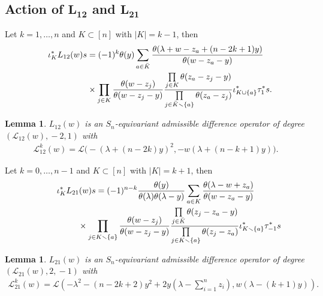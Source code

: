 \documentclass[pdftex]{sigma}
\numberwithin{equation}{section}
\newtheorem{Lemma}[Theorem]{Lemma}
\begin{document}
\subsection[Action of $L_{12}$ and $L_{21}$]{Action of $\boldsymbol{L_{12}}$ and $\boldsymbol{L_{21}}$}\label{ss-6.2}
Let $k=1,\dots,n$ and $K\subset[n]$ with $|K|=k-1$, then
\begin{gather*} \iota^*_K L_{12}(w)s =(-1)^k\theta(y)\sum_{a\in \bar K} \frac {\theta(\lambda+w-z_a+(n-2k+1)y)} {\theta(w-z_a-y)} \\
\hphantom{\iota^*_K L_{12}(w)s =}{} \times \prod_{j\in K} \frac {\theta(w-z_j)} {\theta(w-z_j-y)} \frac {\prod\limits_{j\in K} \theta(z_a-z_j-y) } { \prod\limits_{j\in \bar K\smallsetminus\{a\}} \theta(z_a-z_j) } \iota_{K\cup\{a\}}^*\tau_1^*s.
\end{gather*}
\begin{Lemma}\label{l-L12} $L_{12}(w)$ is an $S_n$-equivariant admissible difference operator of degree $(\mathcal L_{12}(w),\!{-}2,1)$ with
 \begin{gather*}
 \mathcal L^k_{12}(w)=\mathcal L\big({-}(\lambda+(n-2k)y)^2,-w(\lambda+(n-k+1)y)\big).
 \end{gather*}
\end{Lemma}
Let $k=0,\dots,n-1$ and $K\subset[n]$ with $|K|=k+1$, then
\begin{gather*}
\iota^*_K L_{21}(w)s =(-1)^{n-k} \frac {\theta(y)}{\theta(\lambda)\theta(\lambda-y)} \sum_{a\in K} \frac{\theta(\lambda-w+z_a)} {\theta(w-z_a-y)} \\
\hphantom{\iota^*_K L_{21}(w)s =}{} \times \prod_{j\in K\smallsetminus\{a\}} \frac {\theta(w-z_j)} {\theta(w-z_j-y)} \frac {\prod\limits_{j\in \bar K} \theta(z_j-z_a-y) } {\prod\limits_{j\in K\smallsetminus\{a\}} \theta(z_j-z_a) }\iota_{K\smallsetminus\{a\}}^*\tau_{-1}^*s
\end{gather*}
\begin{Lemma}\label{l-L21} $L_{21}(w)$ is an $S_n$-equivariant admissible difference operator of degree $(\mathcal L_{21}(w),2,\!{-}1)$ with
 \begin{gather*}
 \mathcal L^k_{21}(w)=\mathcal L\left({-}\lambda^2-(n-2k+2)y^2+2y\left(\lambda-\sum_{i=1}^nz_i\right),w(\lambda-(k+1)y)\right).
 \end{gather*}
\end{Lemma}
\end{document}
